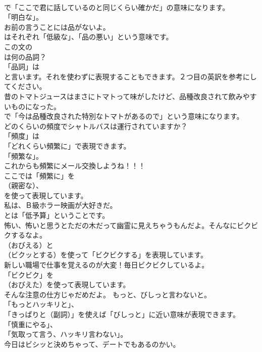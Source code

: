\documentclass[8pt]{extreport}
\begin{document}
\begin{CJK}{UTF8}{min}
\\	で「ここで君に話しているのと同じくらい確かだ」の意味になります。
\\	「明白な」。	
\\	お前の言うことには品がないよ。 
\\	はそれぞれ「低級な」、「品の悪い」という意味です。	
\\	この文の 
\\	は何の品詞？ 
\\	「品詞」は 
\\	と言います。それを使わずに表現することもできます。２つ目の英訳を参考にしてください。	
\\	昔のトマトジュースはまさにトマトって味がしたけど、品種改良されて飲みやすいものになった。 
\\	で「今は品種改良された特別なトマトがあるので」という意味になります。	
\\	どのくらいの頻度でシャトルバスは運行されていますか？ 
\\	「頻度」は
\\	「どれくらい頻繁に」で表現できます。
\\	「頻繁な」。	
\\	これからも頻繁にメール交換しようね！！！ 
\\	ここでは「頻繁に」を
\\	（親密な）、
\\	を使って表現しています。	
\\	私は、Ｂ級ホラー映画が大好きだ。 
\\	とは「低予算」ということです。	
\\	怖い、怖いと思うとただの木だって幽霊に見えちゃうもんだよ。そんなにビクビクするなよ。 
\\	（おびえる）と 
\\	（ビクッとする）を使って「ビクビクする」を表現しています。	
\\	新しい職場で仕事を覚えるのが大変！毎日ビクビクしているよ。 
\\	「ビクビク」を 
\\	（おびえた）を使って表現しています。	
\\	そんな注意の仕方じゃだめだよ。 もっと、びしっと言わないと。 
\\	「もっとハッキリと」、
\\	「きっぱりと（副詞）」を使えば「びしっと」に近い意味が表現できます。
\\	「慎重にやる」、
\\	「気取って言う、ハッキリ言わない」。	
\\	今日はビシッと決めちゃって、デートでもあるのかい。 

\end{CJK}
\end{document}
